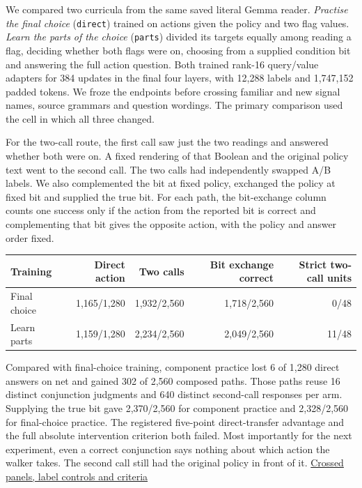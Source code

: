 \documentclass[11pt]{article}
\begin{document}
We compared two curricula from the same saved literal Gemma reader. \emph{Practise the final choice} (\texttt{direct}) trained on actions given the policy and two flag values. \emph{Learn the parts of the choice} (\texttt{parts}) divided its targets equally among reading a flag, deciding whether both flags were on, choosing from a supplied condition bit and answering the full action question. Both trained rank-16 query/value adapters for 384 updates in the final four layers, with 12,288 labels and 1,747,152 padded tokens. We froze the endpoints before crossing familiar and new signal names, source grammars and question wordings. The primary comparison used the cell in which all three changed.

For the two-call route, the first call saw just the two readings and answered whether both were on. A fixed rendering of that Boolean and the original policy text went to the second call. The two calls had independently swapped A/B labels. We also complemented the bit at fixed policy, exchanged the policy at fixed bit and supplied the true bit. For each path, the bit-exchange column counts one success only if the action from the reported bit is correct and complementing that bit gives the opposite action, with the policy and answer order fixed.

\begin{center}
\small\renewcommand{\arraystretch}{1.15}
\begin{tabular}{@{}lrrrr@{}}
\toprule
Training & Direct action & Two calls & Bit exchange correct & Strict two-call units \\
\midrule
Final choice & 1,165/1,280 & 1,932/2,560 & 1,718/2,560 & 0/48 \\
Learn parts & 1,159/1,280 & 2,234/2,560 & 2,049/2,560 & 11/48 \\
\bottomrule
\end{tabular}
\end{center}

Compared with final-choice training, component practice lost 6 of 1,280 direct answers on net and gained 302 of 2,560 composed paths. Those paths reuse 16 distinct conjunction judgments and 640 distinct second-call responses per arm. Supplying the true bit gave 2,370/2,560 for component practice and 2,328/2,560 for final-choice practice. The registered five-point direct-transfer advantage and the full absolute intervention criterion both failed. Most importantly for the next experiment, even a correct conjunction says nothing about which action the walker takes. The second call still had the original policy in front of it. \href{https://github.com/RyoSpiralArchitect/self-fold/blob/v1.0.0/provenance/two_flags_20261104/RESULTS.md}{Crossed panels, label controls and criteria}
\end{document}
